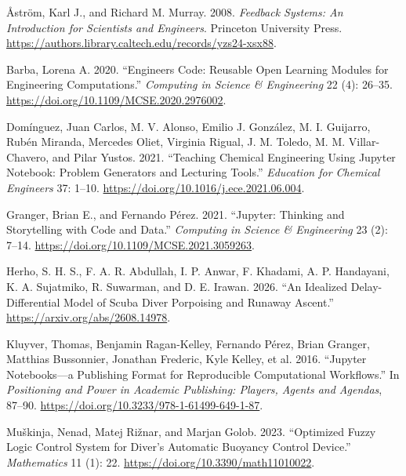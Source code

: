 \documentclass[
]{article}
\newlength{\cslhangindent}
\newlength{\cslentryspacingunit} %
\newenvironment{CSLReferences}[2] %
 {%
  \setlength{\parindent}{0pt}
  \ifodd #1
  \let\oldpar\par
  \def\par{\hangindent=\cslhangindent\oldpar}
  \fi
  \setlength{\parskip}{#2\cslentryspacingunit}
 }%
 {}
\begin{document}
\hypertarget{refs}{}
\begin{CSLReferences}{1}{0}
\leavevmode{}%
Åström, Karl J., and Richard M. Murray. 2008. \emph{Feedback Systems: An
Introduction for Scientists and Engineers}. Princeton University Press.
\url{https://authors.library.caltech.edu/records/yzs24-xsx88}.

\leavevmode{}%
Barba, Lorena A. 2020. {``Engineers Code: Reusable Open Learning Modules
for Engineering Computations.''} \emph{Computing in Science \&
Engineering} 22 (4): 26--35.
\url{https://doi.org/10.1109/MCSE.2020.2976002}.

\leavevmode{}%
Domínguez, Juan Carlos, M. V. Alonso, Emilio J. González, M. I.
Guijarro, Rubén Miranda, Mercedes Oliet, Virginia Rigual, J. M. Toledo,
M. M. Villar-Chavero, and Pilar Yustos. 2021. {``Teaching Chemical
Engineering Using Jupyter Notebook: Problem Generators and Lecturing
Tools.''} \emph{Education for Chemical Engineers} 37: 1--10.
\url{https://doi.org/10.1016/j.ece.2021.06.004}.

\leavevmode{}%
Granger, Brian E., and Fernando Pérez. 2021. {``Jupyter: Thinking and
Storytelling with Code and Data.''} \emph{Computing in Science \&
Engineering} 23 (2): 7--14.
\url{https://doi.org/10.1109/MCSE.2021.3059263}.

\leavevmode{}%
Herho, S. H. S., F. A. R. Abdullah, I. P. Anwar, F. Khadami, A. P.
Handayani, K. A. Sujatmiko, R. Suwarman, and D. E. Irawan. 2026. {``An
Idealized Delay-Differential Model of Scuba Diver Porpoising and Runaway
Ascent.''} \url{https://arxiv.org/abs/2608.14978}.

\leavevmode{}%
Kluyver, Thomas, Benjamin Ragan-Kelley, Fernando Pérez, Brian Granger,
Matthias Bussonnier, Jonathan Frederic, Kyle Kelley, et al. 2016.
{``Jupyter Notebooks---a Publishing Format for Reproducible
Computational Workflows.''} In \emph{Positioning and Power in Academic
Publishing: Players, Agents and Agendas}, 87--90.
\url{https://doi.org/10.3233/978-1-61499-649-1-87}.

\leavevmode{}%
Muškinja, Nenad, Matej Rižnar, and Marjan Golob. 2023. {``Optimized
Fuzzy Logic Control System for Diver's Automatic Buoyancy Control
Device.''} \emph{Mathematics} 11 (1): 22.
\url{https://doi.org/10.3390/math11010022}.


\end{CSLReferences}
\end{document}
